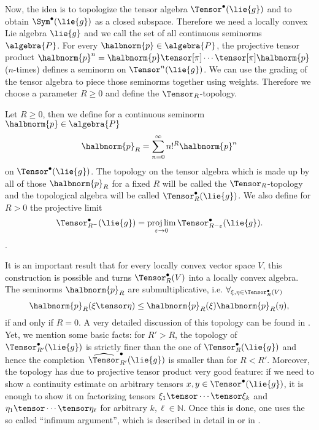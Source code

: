 \documentclass[
11pt,                          %
english                        %
]{article}
\begin{document}
Now, the idea is to topologize the tensor algebra $\Tensor^{\bullet}(\lie{g})$ and to 
obtain $\Sym^{\bullet}(\lie{g})$ as a closed subspace. Therefore we need a locally 
convex Lie algebra $\lie{g}$ and we call the set of all continuous seminorms 
$\algebra{P}$. For every $\halbnorm{p} \in \algebra{P}$, the projective tensor 
product $\halbnorm{p}^n = \halbnorm{p} \tensor[\pi] \cdots \tensor[\pi] \halbnorm{p}$ 
($n$-times) defines a seminorm on $\Tensor^n(\lie{g})$. We can use the grading of the 
tensor algebra to piece those seminorms together using weights. Therefore we choose a 
parameter $R \geq 0$ and define the $\Tensor_R$-topology.
\begin{definition}
	Let $R \geq 0$, then we define for a continuous seminorm 
	$\halbnorm{p} \in \algebra{P}$
	\begin{equation}
		\label{def:TR-seminorms}
		\halbnorm{p}_R
		=
		\sum\limits_{n=0}^\infty
		n!^R \halbnorm{p}^n
	\end{equation}
	on $\Tensor^{\bullet}(\lie{g})$. The topology on the tensor algebra which is made 
	up by all of those $\halbnorm{p}_R$ for a fixed $R$ will be called the 
	$\Tensor_R$-topology and the topological algebra will be called 
	$\Tensor_R^{\bullet}(\lie{g})$. We also define for $R > 0$ the projective limit
	\begin{equation}
		\label{def:TR-projective}
		\Tensor_{R^-}^{\bullet}(\lie{g})
		=
		\projlim\limits_{\varepsilon \rightarrow 0}
		\Tensor_{R - \varepsilon}^{\bullet}(\lie{g}).
	\end{equation}.
\end{definition}
It is an important result that for every locally convex vector space $V$, this 
construction is possible and turns $\Tensor_R^{\bullet}(V)$ into a locally convex 
algebra. The seminorms $\halbnorm{p}_R$ are submultiplicative, i.e. $\forall_{\xi, 
\eta \in \Tensor_R^{\bullet}(V)}$
\begin{equation}
	\label{eq:TR-submultiplicative}
	\halbnorm{p}_R(\xi \tensor \eta)
	\leq
	\halbnorm{p}_R(\xi)
	\halbnorm{p}_R(\eta),
\end{equation}
if and only if $R = 0$. A very detailed discussion of this topology can be found in 
\cite{waldmann:2014a}. Yet, we mention some basic facts: for $R' > R$, the 
topology of $\Tensor_{R'}^{\bullet}(\lie{g})$ is strictly finer than the one of 
$\Tensor_R^{\bullet}(\lie{g})$ and hence the completion 
$\widehat{\Tensor}_{R'}^{\bullet}(\lie{g})$ is smaller than for $R < R'$.
Moreover, the topology has due to projective tensor product very good feature: if we 
need to show a continuity estimate on arbitrary tensors $x,y \in \Tensor^{\bullet}
(\lie{g})$, it is enough to show it on factorizing tensors $\xi_1 \tensor \cdots 
\tensor \xi_k$ and $\eta_1 \tensor \cdots \tensor \eta_\ell$ for arbitrary $k, \ell 
\in \mathbb{N}$. Once this is done, one uses the so called ``infimum argument'', 
which is described in detail in 
\cite[Proposition 3.2]{esposito.stapor.waldmann:2015a:pre} or in 
\cite[Lemma 3.2]{waldmann:2014a}. 
\end{document}
